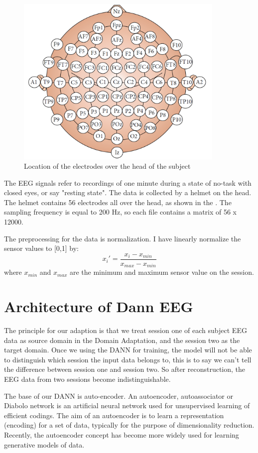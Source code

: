 \begin{figure}[htbp]
	\centering
	\includegraphics[width=10cm]{Figures/eegcollect.png}
	\caption[Location of the electrodes over the head of the subject]{Location of the electrodes over the head of the subject}
	\label{fig:eegcollect}
\end{figure}

The EEG signals refer to recordings of one minute during a state of no-task with closed eyes, or say "resting state". The data is collected by a helmet on the head. The helmet contains 56 electrodes all over the head, as shown in the . The sampling frequency is equal to 200 Hz, so each file contains a matrix of 56 x 12000. 

The preprocessing for the data is normalization. I have linearly normalize the sensor values to [0,1] by:
\[ x_{i}' = \frac{x_{i}-x_{min}}{x_{max}-x_{min}} \] 
where $ x_{min} $ and $ x_{max} $ are the minimum and maximum sensor value on the session.

\section{Architecture of Dann EEG}
The principle for our adaption is that we treat session one of each subject EEG data as source domain in the Domain Adaptation, and the session two as the target domain. Once we using the DANN for training, the model will not be able to distinguish which session the input data belongs to, this is to say we can't tell the difference between session one and session two. So after reconstruction, the EEG data from two sessions become indistinguishable.

The base of our DANN is auto-encoder. An autoencoder, autoassociator or Diabolo network\cite{bengio2009learning} is an artificial neural network used for unsupervised learning of efficient codings.\cite{liou2008modeling} The aim of an autoencoder is to learn a representation (encoding) for a set of data, typically for the purpose of dimensionality reduction. Recently, the autoencoder concept has become more widely used for learning generative models of data.\cite{kingma2013auto}

